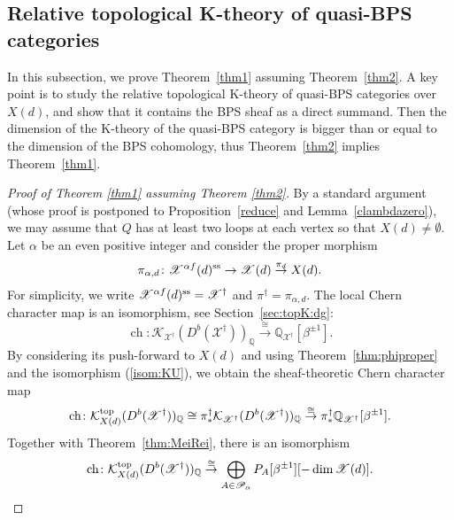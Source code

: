 \documentclass [11pt,oneside,a4paper,mathscr]{amsart}
\theoremstyle{definition}
\newcommand{\X}{\mathscr{X}}
\newcommand{\ch}{\operatorname{ch}}
\begin{document}
\subsection{Relative topological K-theory of quasi-BPS categories}\label{subsec:reltop}
In this subsection, we prove Theorem~\ref{thm1}
assuming Theorem~\ref{thm2}. 
A key point is to 
study the relative topological K-theory 
of quasi-BPS categories over $X(d)$, and show that 
it contains the BPS sheaf as a direct summand. 
Then the dimension of the K-theory of the quasi-BPS category is bigger 
than or equal to the dimension of the BPS 
cohomology, thus Theorem~\ref{thm2} implies 
Theorem~\ref{thm1}. 

\begin{proof}[Proof of Theorem \ref{thm1} assuming Theorem \ref{thm2}]
By a standard argument (whose proof is postponed to Proposition~\ref{reduce} and Lemma~\ref{clambdazero}), 
	we may assume that $Q$ has at least two loops at each vertex
 so that $X(d) \neq \emptyset$. 
	Let $\alpha$ be an even positive integer and consider 
	the proper morphism 
	\begin{align*}
		\pi_{\alpha, d} \colon \X^{\alpha f}(d)^{\rm{ss}} \to \X(d) \stackrel{\pi_d}{\to} X(d). 
		\end{align*}
	For simplicity, we write $\X^{\alpha f}(d)^{\rm{ss}}=\X^{\dag}$ and 
	$\pi^{\dag}=\pi_{\alpha, d}$. 
		The local Chern character map is an isomorphism, see Section~\ref{sec:topK:dg}:
	\[\ch \colon \mathcal{K}_{\X^{\dag}}(D^b(\X^{\dag}))_{\mathbb{Q}}\stackrel{\cong}{\to}
	\mathbb{Q}_{\X^{\dag}}[\beta^{\pm 1}].\] 
	By considering its push-forward to $X(d)$ and
 using Theorem~\ref{thm:phiproper} and the isomorphism (\ref{isom:KU}), 
 we obtain 
	the sheaf-theoretic Chern character map 
	\begin{align*}
		\ch \colon 
		\mathcal{K}_{X(d)}^{\rm{top}}(D^b(\X^{\dag}))_{\mathbb{Q}} \cong
  \pi^{\dag}_{\ast}\mathcal{K}_{\X^{\dag}}(D^b(\X^{\dag}))_{\mathbb{Q}} \stackrel{\cong}{\to}
  \pi^{\dag}_{\ast}\mathbb{Q}_{\X^{\dag}}[\beta^{\pm 1}]. 
		\end{align*}
Together with Theorem~\ref{thm:MeiRei}, there is an isomorphism 
	\begin{align}
		\ch \colon \label{KX(d)}
			\mathcal{K}_{X(d)}^{\rm{top}}(D^b(\X^{\dag}))_{\mathbb{Q}}\stackrel{\cong}{\to} \bigoplus_{A \in \mathscr{P}_{\alpha}}P_A[\beta^{\pm 1}][-\dim \X(d)]. 
		\end{align}
  

\end{proof}
\end{document}

